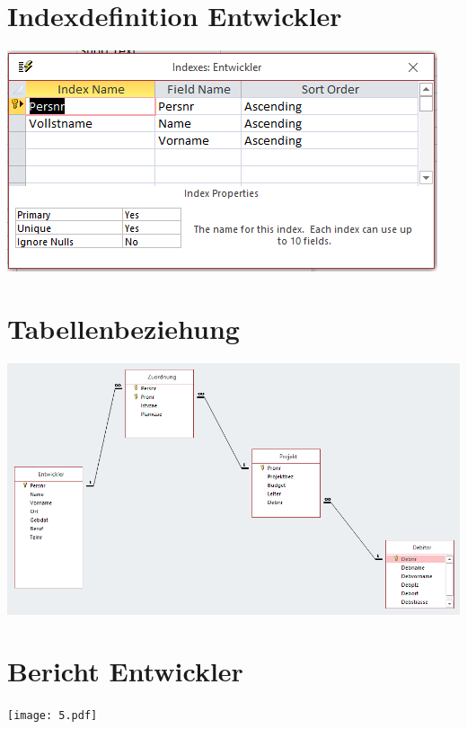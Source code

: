 \section{Indexdefinition Entwickler}
\includegraphics[width=.98\columnwidth]{3.PNG}

\section{Tabellenbeziehung}
\includegraphics[width=.98\columnwidth]{4.PNG}

\section{Bericht Entwickler}
\texttt{[image: 5.pdf]}

